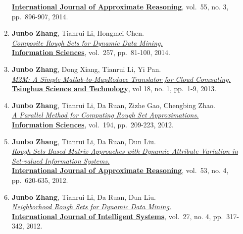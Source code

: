 \documentclass[10pt,a4paper]{article}
\begin{document}
\begin{enumerate}
  \href{http://www.journals.elsevier.com/international-journal-of-approximate-reasoning}{\textbf{International
  Journal of Approximate Reasoning}}, vol.~55, no. 3, pp.~896-907, 2014.
\item
  \textbf{Junbo Zhang}, Tianrui Li, Hongmei Chen.\\
  \href{http://dx.doi.org/10.1016/j.ins.2013.08.016}{\emph{Composite
  Rough Sets for Dynamic Data Mining.}}\\
  \href{http://www.journals.elsevier.com/information-sciences}{\textbf{Information
  Sciences}}, vol.~257, pp.~81-100, 2014.
\item
  \textbf{Junbo Zhang}, Dong Xiang, Tianrui Li, Yi Pan.\\
  \href{http://ieeexplore.ieee.org/xpl/articleDetails.jsp?tp=\&arnumber=6449402\&contentType=Journals+\%26+Magazines\&queryText\%3DM2M\%3A+A+simple+Matlab-to-MapReduce+translator+for+Cloud+Computing}{\emph{M2M:
  A Simple Matlab-to-MapReduce Translator for Cloud Computing.}}\\
  \href{http://qhxb.lib.tsinghua.edu.cn/english/}{\textbf{Tsinghua
  Science and Technology}}, vol 18, no. 1, pp.~1-9, 2013.
\item
  \textbf{Junbo Zhang}, Tianrui Li, Da Ruan, Zizhe Gao, Chengbing
  Zhao.\\ \href{http://dx.doi.org/10.1016/j.ins.2011.12.036}{\emph{A
  Parallel Method for Computing Rough Set Approximations.}}\\
  \href{http://www.journals.elsevier.com/information-sciences}{\textbf{Information
  Sciences}}, vol.~194, pp.~209-223, 2012.
\item
  \textbf{Junbo Zhang}, Tianrui Li, Da Ruan, Dun Liu.\\
  \href{http://dx.doi.org/10.1016/j.ijar.2012.01.001}{\emph{Rough Sets
  Based Matrix Approaches with Dynamic Attribute Variation in Set-valued
  Information Systems.}}\\
  \href{http://www.journals.elsevier.com/international-journal-of-approximate-reasoning}{\textbf{International
  Journal of Approximate Reasoning}}, vol.~53, no. 4, pp.~620-635, 2012.
\item
  \textbf{Junbo Zhang}, Tianrui Li, Da Ruan, Dun Liu.\\
  \href{http://dx.doi.org/10.1002/int.21523}{\emph{Neighborhood Rough
  Sets for Dynamic Data Mining.}}\\
  \href{http://onlinelibrary.wiley.com/journal/10.1002/{[}ISSN{]}1098-111X}{\textbf{International
  Journal of Intelligent Systems}}, vol.~27, no. 4, pp.~317-342, 2012.
\end{enumerate}
\end{document}
